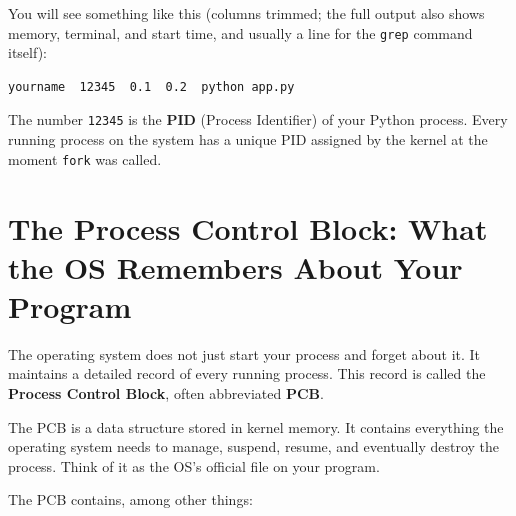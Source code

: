 \begin{codebox}[short]

\begin{Shaded}
\begin{Highlighting}[]
\KeywordTok{|} 
\end{Highlighting}
\end{Shaded}

\end{codebox}

\noindent{}You will see something like this (columns trimmed; the full output also shows memory, terminal, and start time, and usually a line for the \texttt{grep} command itself):

\begin{outputbox}[short]
\begin{Verbatim}[fontsize=\codesize, breaklines, breakanywhere, breaksymbolleft={\tiny\textcolor{muted}{$\hookrightarrow$}}]
yourname  12345  0.1  0.2  python app.py
\end{Verbatim}
\end{outputbox}

\noindent{}The number \texttt{12345} is the \textbf{PID} (Process Identifier) of your Python process. Every running process on the system has a unique PID assigned by the kernel at the moment \texttt{fork} was called.

\setcounter{section}{3}
\section{The Process Control Block: What the OS Remembers About Your Program}\label{01-command-to-process:14-the-process-control-block-what-the-os-remembers-about-your-program}

The operating system does not just start your process and forget about it. It maintains a detailed record of every running process. This record is called the \textbf{Process Control Block}, often abbreviated \textbf{PCB}.

The PCB is a data structure stored in kernel memory. It contains everything the operating system needs to manage, suspend, resume, and eventually destroy the process. Think of it as the OS's official file on your program.

The PCB contains, among other things:


